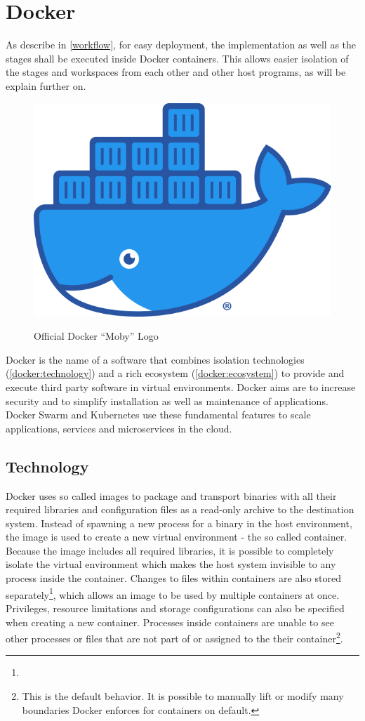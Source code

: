 \section{Docker}
\label{docker:image}

As describe in \autoref{workflow}, for easy deployment, the implementation as well as the stages shall be executed inside Docker\cite{docker:main} containers.
This allows easier isolation of the stages and workspaces from each other and other host programs, as will be explain further on.

\begin{figure}
	\centering
	\includegraphics[width=.2\textwidth]{res/docker-Moby-logo.png}
	\label{docker:logo}
	\caption{Official Docker \enquote{Moby} Logo\cite{docker:logo}}
	\vspace{1cm}
\end{figure}

Docker is the name of a software that combines isolation technologies (\autoref{docker:technology}) and a rich ecosystem (\autoref{docker:ecosystem}) to provide and execute third party software in virtual environments.
Docker aims are to increase security and to simplify installation as well as maintenance of applications.
Docker Swarm\cite{docker:swarm:key-concepts} and Kubernetes\cite{kubernetes:overview} use these fundamental features to scale applications, services and microservices in the cloud.


\subsection{Technology}
\label{docker:technology}


Docker uses so called images to package and transport binaries with all their required libraries and configuration files as a read-only archive to the destination system.
Instead of spawning a new process for a binary in the host environment, the image is used to create a new virtual environment - the so called container.
Because the image includes all required libraries, it is possible to completely isolate the virtual environment which makes the host system invisible to any process inside the container.
Changes to files within containers are also stored separately\footnote{}, which allows an image to be used by multiple containers at once.
Privileges, resource limitations and storage configurations can also be specified when creating a new container.
Processes inside containers are unable to see  other processes or files that are not part of or assigned to the their container\footnote{This is the default behavior. It is possible to manually lift or modify many boundaries Docker enforces for containers on default.}.

